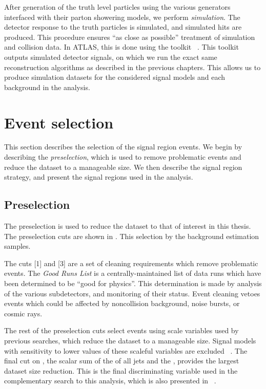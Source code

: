 After generation of the truth level particles using the various generators interfaced with their parton showering models, we perform \textit{simulation}.
The detector response to the truth particles is simulated, and simulated hits are produced.
This procedure ensures ``as close as possible'' treatment of simulation and collision data.
In ATLAS, this is done using the \GEANTFour toolkit ~\cite{Agostinelli:2002hh}.
This toolkit outputs simulated detector signals, on which we run the exact same reconstruction algorithms as described in the previous chapters.
This allows us to produce simulation datasets for the considered signal models and each background in the analysis.

\section{Event selection}

This section describes the selection of the signal region events.
We begin by describing the \textit{preselection}, which is used to remove problematic events and reduce the dataset to a manageable size.
We then describe the signal region strategy, and present the signal regions used in the analysis.

\subsection{Preselection}

The preselection is used to reduce the dataset to that of interest in this thesis.
The preselection cuts are shown in .
This selection by the background estimation samples.

The cuts [1] and [3] are a set of cleaning requirements which remove problematic events.
The \textit{Good Runs List} is a centrally-maintained list of data runs which have been determined to be ``good for physics''.
This determination is made by analysis of the various subdetectors, and monitoring of their status.
Event cleaning vetoes events which could be affected by noncollision background, noise bursts, or cosmic rays.

The rest of the preselection cuts select events using scale variables used by previous searches, which reduce the dataset to a manageable size.
Signal models with sensitivity to lower values of these scaleful variables are excluded ~\cite{0-leptonPaper,0LPaper_13TeV}.
The final cut on \meff, the scalar sum of the \pt of all jets and the \met, provides the largest dataset size reduction.
This is the final discriminating variable used in the complementary search to this analysis, which is also presented in ~\cite{ATLAS-CONF-2016-078}.

